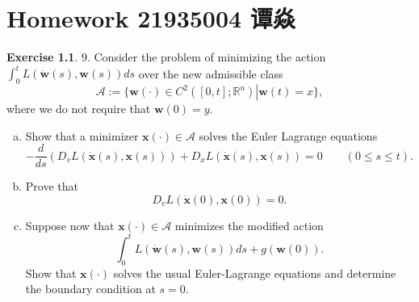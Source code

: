 \documentclass[a4paper]{book}
\makeatletter
\newcommand{\voidenvironment}[1]{%
  \expandafter\providecommand\csname env@#1@save@env\endcsname{}%
  \expandafter\providecommand\csname env@#1@process\endcsname{}%
  \@ifundefined{#1}{}{\RenewEnviron{#1}{}}%
}
\numberwithin{equation}{chapter}
\theoremstyle{definition}
\newtheorem{exc}[exm]{Exercise}
\makeatother
\begin{document}
\pagestyle{empty}
% 



\setcounter{chapter}{6}




\chapter{Homework 21935004 谭焱}


\begin{exc}
  9.  Consider the problem of minimizing the action $\int_0^t L(\dot{\mathbf{w}}(s),\mathbf{w}(s))ds$ over the new admissible class
  \[\mathcal{A} := \{ \left. \mathbf{w}(\cdot) \in C^2([0,t]; \mathbb{R}^n) \right| \mathbf{w}(t) = x\},\]
  where we do not require that $\mathbf{w}(0) = y$.
  \begin{enumerate} [(a)]
  \item Show that a minimizer $\mathbf{x}(\cdot) \in \mathcal{A}$ solves the Euler Lagrange equations
    \[-\frac{d}{ds}(D_v L(\dot{\mathbf{x}}(s), \mathbf{x}(s))) + D_x L(\dot{\mathbf{x}}(s), \mathbf{x}(s)) = 0 \qquad (0 \leq s \leq t).\]

  \item Prove that
    \[D_v L(\dot{\mathbf{x}}(0), \mathbf{x}(0)) = 0.\]

  \item Suppose now that $\mathbf{x}(\cdot) \in \mathcal{A}$ minimizes the modified action
    \[\int_0^t L(\dot{\mathbf{w}}(s),\mathbf{w}(s))ds + g(\mathbf{w}(0)).\]
    Show that $\mathbf{x}(\cdot)$ solves the usual Euler-Lagrange equations and determine the boundary condition at $s = 0$.
  \end{enumerate}
\end{exc}
\end{document}
